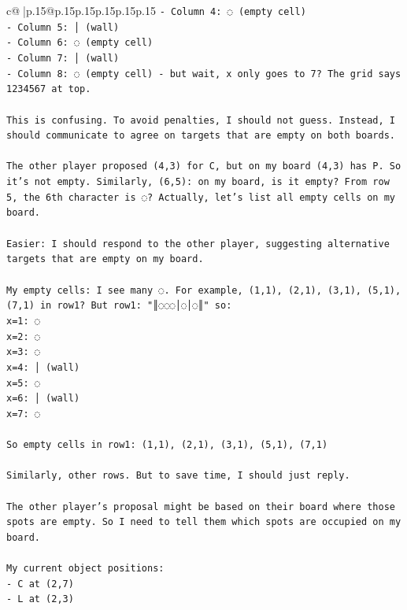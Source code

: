 \documentclass{article}
\begin{document}
{\begin{supertabular}{c@{$\;$}|p{.15\linewidth}@{}p{.15\linewidth}p{.15\linewidth}p{.15\linewidth}p{.15\linewidth}p{.15\linewidth}}
{{{\texttt{{-} Column 4: ◌ (empty cell)} \\
\texttt{{-} Column 5: │ (wall)} \\
\texttt{{-} Column 6: ◌ (empty cell)} \\
\texttt{{-} Column 7: │ (wall)} \\
\texttt{{-} Column 8: ◌ (empty cell) {-} but wait, x only goes to 7? The grid says 1234567 at top.} \\
\\ 
\texttt{This is confusing. To avoid penalties, I should not guess. Instead, I should communicate to agree on targets that are empty on both boards.} \\
\\ 
\texttt{The other player proposed (4,3) for C, but on my board (4,3) has P. So it's not empty. Similarly, (6,5): on my board, is it empty? From row 5, the 6th character is ◌? Actually, let's list all empty cells on my board.} \\
\\ 
\texttt{Easier: I should respond to the other player, suggesting alternative targets that are empty on my board.} \\
\\ 
\texttt{My empty cells: I see many ◌. For example, (1,1), (2,1), (3,1), (5,1), (7,1) in row1? But row1: "║◌◌◌│◌│◌║" so:} \\
\texttt{x=1: ◌} \\
\texttt{x=2: ◌} \\
\texttt{x=3: ◌} \\
\texttt{x=4: │ (wall)} \\
\texttt{x=5: ◌} \\
\texttt{x=6: │ (wall)} \\
\texttt{x=7: ◌} \\
\\ 
\texttt{So empty cells in row1: (1,1), (2,1), (3,1), (5,1), (7,1)} \\
\\ 
\texttt{Similarly, other rows. But to save time, I should just reply.} \\
\\ 
\texttt{The other player's proposal might be based on their board where those spots are empty. So I need to tell them which spots are occupied on my board.} \\
\\ 
\texttt{My current object positions:} \\
\texttt{{-} C at (2,7)} \\
\texttt{{-} L at (2,3)} \\
}}}
\end{supertabular}}
\end{document}
